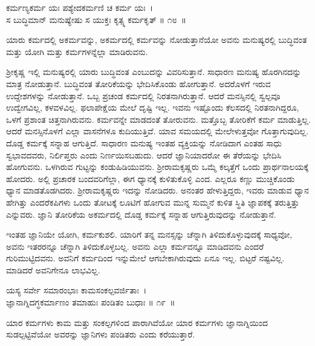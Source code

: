 \begin{shloka}
ಕರ್ಮಣ್ಯಕರ್ಮ ಯಃ ಪಶ್ಯೇದಕರ್ಮಣಿ ಚ ಕರ್ಮ ಯಃ~।\\ಸ ಬುದ್ಧಿಮಾನ್ ಮನುಷ್ಯೇಷು ಸ ಯುಕ್ತಃ ಕೃತ್ಸ್ನ ಕರ್ಮಕೃತ್ \hfill॥ ೧೮~॥
\end{shloka}

\begin{artha}
ಯಾರು ಕರ್ಮದಲ್ಲಿ ಅಕರ್ಮವನ್ನು, ಅಕರ್ಮದಲ್ಲಿ ಕರ್ಮವನ್ನು ನೋಡುತ್ತಾನೆಯೋ ಅವನು ಮನುಷ್ಯರಲ್ಲಿ ಬುದ್ಧಿವಂತ ಮತ್ತು ಯೋಗಿ ಮತ್ತು ಕರ್ಮಗಳನ್ನೆಲ್ಲಾ ಮಾಡಿರುವನು.
\end{artha}

ಶ‍್ರೀಕೃಷ್ಣ ಇಲ್ಲಿ ಮನುಷ್ಯರಲ್ಲಿ ಯಾರು ಬುದ್ಧಿವಂತ ಎಂಬುದನ್ನು ವಿವರಿಸುತ್ತಾನೆ. ಸಾಧಾರಣ ಮನುಷ್ಯ ಹೊರಗಿನದನ್ನು ಮಾತ್ರ ನೋಡುತ್ತಾನೆ. ಬುದ್ಧಿವಂತ ತೋರಿಕೆಯನ್ನು ಭೇದಿಸಿಕೊಂಡು ಹೋಗುತ್ತಾನೆ. ಅದರೊಳಗೆ ಇರುವ ಉದ್ದೇಶಗಳನ್ನು ನೋಡುತ್ತಾನೆ. ಒಬ್ಬ ಪ್ರಚಂಡ ಕರ್ಮದಲ್ಲಿ ನಿರತನಾಗಿರುತ್ತಾನೆ. ಆದರೆ ಮನಸ್ಸಿನಲ್ಲಿ ಸ್ವಲ್ಪವೂ ಉದ್ವೇಗವಿಲ್ಲ, ಕಳವಳವಿಲ್ಲ. ಫಲಾಪೇಕ್ಷೆಯ ಮೇಲೆ ದೃಷ್ಟಿ ಇಲ್ಲ. ಇವನು ಇಷ್ಟೊಂದು ಕೆಲಸದಲ್ಲಿ ನಿರತನಾಗಿದ್ದರೂ, ಒಳಗೆ ಪ್ರಶಾಂತ ಚಿತ್ತನಾಗಿರುವನು. ಕರ್ಮವನ್ನೇ ಮಾಡದಂತೆ ತೋರುವನು. ಮತ್ತೊಬ್ಬ ತೋರಿಕೆಗೆ ಕರ್ಮ ಮಾಡುತ್ತಿಲ್ಲ. ಆದರೆ ಮನಸ್ಸಿನೊಳಗೆ ಎಲ್ಲಾ ವಾಸನೆಗಳೂ ಕುದಿಯುತ್ತಿವೆ. ಯಾವ ಸಮಯದಲ್ಲಿ ಮೇಲೇಳುತ್ತವೋ ಗೊತ್ತಾಗುವುದಿಲ್ಲ. ದೊಡ್ಡ ಕರ್ಮಕ್ಕೆ ಸನ್ನಾಹ ಆಗುತ್ತಿದೆ. ಸಾಧಾರಣ ಮನುಷ್ಯ ಇಂತಹ ವ್ಯಕ್ತಿಯನ್ನು ನೋಡಿದಾಗ ಎಂತಹ ಸಾಧು ಸ್ವಭಾವದವರು, ನಿರ್ಲಿಪ್ತರು ಎಂದು ನಿರ್ಣಯಿಸಬಹುದು. ಆದರೆ ಜ್ಞಾನಿಯಾದರೋ ಈ ತೆರೆಯನ್ನು ಭೇದಿಸಿ ಹೋಗುವನು. ಒಳಗಿರುವ ಗುಟ್ಟನ್ನು ಕಂಡುಹಿಡಿಯುವನು. ಶ‍್ರೀರಾಮಕೃಷ್ಣರು ಒಮ್ಮೆ ಕಲ್ಕತ್ತೆಗೆ ಒಂದು ಪ್ರಾರ್ಥನಾಲಯಕ್ಕೆ ಹೋದರು. ಅಲ್ಲಿ ಪ್ರಚಾರಕ ಬಂದವರಿಗೆಲ್ಲಾ, ಈಗ ಧ್ಯಾನಕ್ಕೆ ಕುಳಿತುಕೊಳ್ಳಿ ಎಂದ. ಎಲ್ಲರೂ ಕಣ್ಣು ಮುಚ್ಚಿಕೊಂಡು ಧ್ಯಾನ ಮಾಡತೊಡಗಿದರು. ಶ‍್ರೀರಾಮಕೃಷ್ಣರು ಇದನ್ನು ನೋಡಿದರು. ಅನಂತರ ಹೇಳುತ್ತಿದ್ದರು, ಇವರು ಮಾಡುವ ಧ್ಯಾನ ಹೇಗಿತ್ತು ಎಂದರೆ\break ಕಪಿಗಳು ಒಂದು ತೋಟಕ್ಕೆ ಲೂಟಿಗೆ ಹೋಗುವ ಮುನ್ನ ಸುಮ್ಮನೆ ಕುಳಿತ ಸ್ಥಿತಿ ಜ್ಞಾಪಕಕ್ಕೆ ತರುತ್ತಿತ್ತು ಎನ್ನುವರು. ಜ್ಞಾನಿ ತೋರಿಕೆಯ ಅಕರ್ಮದಲ್ಲಿ ದೊಡ್ಡ ಕರ್ಮಕ್ಕೆ ಸನ್ನಾಹ ಆಗುತ್ತಿರುವುದನ್ನು ನೋಡುತ್ತಾನೆ.

ಇಂತಹ ಜ್ಞಾನಿಯೇ ಯೋಗಿ, ಕರ್ಮಕುಶಲಿ. ಯಾರಿಗೆ ತನ್ನ ಮನಸ್ಸನ್ನು ಚೆನ್ನಾಗಿ ತಿಳಿದು\-ಕೊಳ್ಳುವುದಕ್ಕೆ ಸಾಧ್ಯವೋ, ಅವನು ಇತರರನ್ನೂ ಚೆನ್ನಾಗಿ ತಿಳಿದುಕೊಳ್ಳಬಲ್ಲ. ಅವನು ಎಲ್ಲಾ ಕರ್ಮವನ್ನೂ ಮಾಡಿದವನು ಎಂದರೆ ಗುರಿಮುಟ್ಟಿದವನು. ಅವನಿಗೆ ಕರ್ಮದಿಂದ ಇನ್ನುಮೇಲೆ ಆಗ\-ಬೇಕಾಗಿರುವುದು ಏನೂ ಇಲ್ಲ. ಬಿಟ್ಟರೆ ನಷ್ಟವಿಲ್ಲ. ಮಾಡಿದರೆ ಅವನಿಗೇನೂ ಲಾಭವಿಲ್ಲ.

\begin{shloka}
ಯಸ್ಯ ಸರ್ವೇ ಸಮಾರಂಭಾಃ ಕಾಮಸಂಕಲ್ಪವರ್ಜಿತಾಃ~।\\ಜ್ಞಾನಾಗ್ನಿದಗ್ಧಕರ್ಮಾಣಂ ತಮಾಹುಃ ಪಂಡಿತಂ ಬುಧಾಃ \hfill॥ ೧೯~॥
\end{shloka}

\begin{artha}
ಯಾರ ಕರ್ಮಗಳು ಕಾಮ ಮತ್ತು ಸಂಕಲ್ಪಗಳಿಂದ ಪಾರಾಗಿವೆಯೋ ಯಾರ ಕರ್ಮಗಳು ಜ್ಞಾನಾಗ್ನಿಯಿಂದ ಸುಡಲ್ಪಟ್ಟಿವೆಯೋ ಅವರನ್ನು ಜ್ಞಾನಿಗಳು ಪಂಡಿತರು ಎಂದು ಕರೆಯುತ್ತಾರೆ.
\end{artha}

